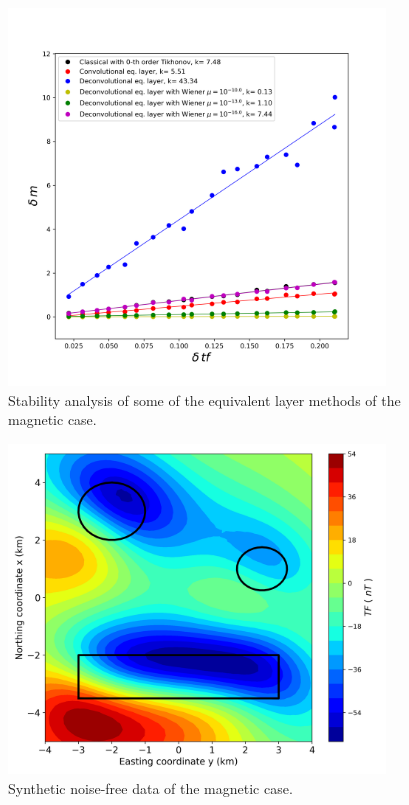 \begin{figure}[htbp]
	\begin{center}
		\includegraphics[width=10cm]{Fig/stability_mag}
	\end{center}
	\caption{Stability analysis of some of the equivalent layer methods of the magnetic case.}
	\label{fig:6}
\end{figure}

\begin{figure}[htbp]
	\begin{center}
		\includegraphics[width=10cm]{Fig/synthetic_mag}
	\end{center}
	\caption{Synthetic noise-free data of the magnetic case.}
	\label{fig:7}
\end{figure}

